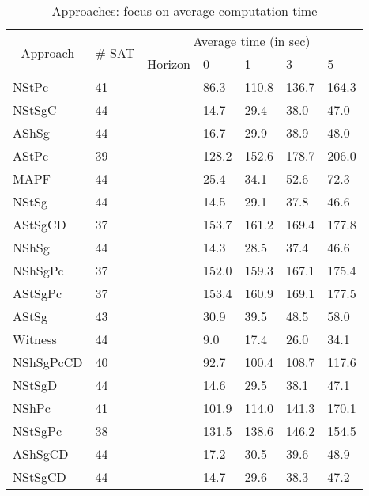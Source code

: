 \begin{table}[H]
\begin{center}
\caption{Approaches: focus on average computation time}
\label{tbl:path_computation_time}
\begin{tabular}{@{}lllllll@{}}
\toprule
 \multicolumn{1}{c}{\multirow{2}{*}{Approach}} & \multirow{2}{*}{\# SAT} & \multicolumn{5}{c}{Average time (in sec)} \\ \cmidrule(l){3-7}  
\multicolumn{1}{c}{} &  & \multicolumn{1}{l|}{Horizon} & 0 & 1 & 3 & 5 \\ \midrule
NStPc & 41 & \cellcolor{lightgrey} & 86.3 & 110.8 & 136.7 & 164.3  \\
NStSgC & 44 & \cellcolor{lightgrey} & 14.7 & 29.4 & 38.0 & 47.0  \\
AShSg & 44 & \cellcolor{lightgrey} & 16.7 & 29.9 & 38.9 & 48.0  \\
AStPc & 39 & \cellcolor{lightgrey} & 128.2 & 152.6 & 178.7 & 206.0  \\
MAPF & 44 & \cellcolor{lightgrey} & 25.4 & 34.1 & 52.6 & 72.3  \\
NStSg & 44 & \cellcolor{lightgrey} & 14.5 & 29.1 & 37.8 & 46.6  \\
AStSgCD & 37 & \cellcolor{lightgrey} & 153.7 & 161.2 & 169.4 & 177.8  \\
NShSg & 44 & \cellcolor{lightgrey} & 14.3 & 28.5 & 37.4 & 46.6  \\
NShSgPc & 37 & \cellcolor{lightgrey} & 152.0 & 159.3 & 167.1 & 175.4  \\
AStSgPc & 37 & \cellcolor{lightgrey} & 153.4 & 160.9 & 169.1 & 177.5  \\
AStSg & 43 & \cellcolor{lightgrey} & 30.9 & 39.5 & 48.5 & 58.0  \\
Witness & 44 & \cellcolor{lightgrey} & 9.0 & 17.4 & 26.0 & 34.1  \\
NShSgPcCD & 40 & \cellcolor{lightgrey} & 92.7 & 100.4 & 108.7 & 117.6  \\
NStSgD & 44 & \cellcolor{lightgrey} & 14.6 & 29.5 & 38.1 & 47.1  \\
NShPc & 41 & \cellcolor{lightgrey} & 101.9 & 114.0 & 141.3 & 170.1  \\
NStSgPc & 38 & \cellcolor{lightgrey} & 131.5 & 138.6 & 146.2 & 154.5  \\
AShSgCD & 44 & \cellcolor{lightgrey} & 17.2 & 30.5 & 39.6 & 48.9  \\
NStSgCD & 44 & \cellcolor{lightgrey} & 14.7 & 29.6 & 38.3 & 47.2  \\
\end{tabular}
\end{center}
\end{table}
